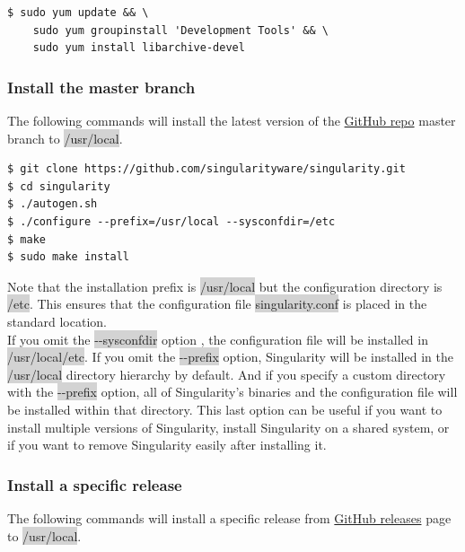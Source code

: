 \documentclass[a4paper]{article}
\newcounter{subsubsubsection}[subsubsection]
\begin{document}

\begin{lstlisting}[frame=single] 
$ sudo yum update && \
    sudo yum groupinstall 'Development Tools' && \
    sudo yum install libarchive-devel
\end{lstlisting}


\subsubsection{Install the master branch}

The following commands will install the latest version of the  \href{https://github.com/singularityware/singularity}{GitHub repo} master branch to \colorbox{lightgray}{/usr/local}.

\begin{lstlisting}[frame=single]  
$ git clone https://github.com/singularityware/singularity.git
$ cd singularity
$ ./autogen.sh
$ ./configure --prefix=/usr/local --sysconfdir=/etc
$ make
$ sudo make install
\end{lstlisting}


Note that the installation prefix is \colorbox{lightgray}{/usr/local} but the configuration directory is \colorbox{lightgray}{/etc}. This ensures that the configuration file \colorbox{lightgray}{singularity.conf} is placed in the standard location.\\

If you omit the \colorbox{lightgray}{-{}-sysconfdir} option , the configuration file will be installed in \colorbox{lightgray}{/usr/local/etc}. If you omit the \colorbox{lightgray}{-{}-prefix} option, Singularity will be installed in the \colorbox{lightgray}{/usr/local} directory hierarchy by default. And if you specify a custom directory with the \colorbox{lightgray}{-{}-prefix} option, all of Singularity’s binaries and the configuration file will be installed within that directory. This last option can be useful if you want to install multiple versions of Singularity, install Singularity on a shared system, or if you want to remove Singularity easily after installing it.
\\

\subsubsection{Install a specific release}

The following commands will install a specific release from 
\href{https://github.com/singularityware/singularity/releases}{GitHub releases} page to \colorbox{lightgray}{/usr/local}.\\[0.1in]
\end{document}
